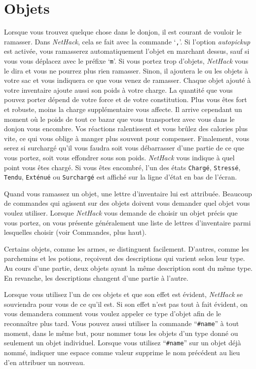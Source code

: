 \documentclass[titlepage]{article}
\begin{document}
\section{Objets}

Lorsque vous trouvez quelque chose dans le donjon, il est courant de vouloir le
ramasser.  Dans \textit{NetHack}, cela se fait avec la commande `\texttt{,}'.
Si l'option \textit{autopickup} est activée, vous ramasserez automatiquement l'objet
en marchant dessus, sauf si vous vous déplacez avec le préfixe `\texttt{m}'.
Si vous portez trop d'objets, \textit{NetHack} vous le dira et vous ne
pourrez plus rien ramasser.  Sinon, il ajoutera le ou les objets
à votre sac et vous indiquera ce que vous venez de ramasser.
Chaque objet ajouté à votre inventaire ajoute aussi son poids
à votre charge.  La quantité que vous pouvez porter dépend de votre force et de
votre constitution.  Plus
vous êtes fort et robuste,
moins la charge supplémentaire vous affecte.  Il arrive cependant
un moment où le poids de tout ce bazar que vous transportez
avec vous dans le donjon vous encombre.  Vos réactions
ralentissent et vous brûlez des calories plus vite, ce qui vous oblige à manger
plus souvent pour compenser.  Finalement, vous serez si surchargé qu'il vous faudra
soit vous débarrasser d'une partie de ce que vous portez, soit vous effondrer sous son poids.
\textit{NetHack} vous indique à quel point vous êtes chargé.
Si vous êtes encombré, l'un des états
\texttt{Chargé}, \texttt{Stressé}, \texttt{Tendu},
\texttt{Exténué} ou \texttt{Surchargé} est
affiché sur la ligne d'état en bas de l'écran.

Quand vous ramassez un objet, une lettre d'inventaire lui est attribuée.  Beaucoup
de commandes qui agissent sur des objets doivent vous demander quel objet
vous voulez utiliser.  Lorsque \textit{NetHack} vous demande de choisir un objet précis
que vous portez, on vous présente généralement une liste de lettres
d'inventaire parmi lesquelles choisir (voir Commandes, plus haut).

Certains objets, comme les armes, se distinguent facilement.  D'autres, comme
les parchemins et les potions, reçoivent des descriptions qui varient selon leur
type.  Au cours d'une partie, deux objets ayant la même description sont
du même type.  En revanche, les descriptions changent d'une partie à l'autre.

Lorsque vous utilisez l'un de ces objets et que son effet est évident, \textit{NetHack}
se souviendra pour vous de ce qu'il est.  Si son effet n'est pas tout à fait
évident, on vous demandera comment vous voulez appeler ce type d'objet
afin de le reconnaître plus tard.  Vous pouvez aussi utiliser la commande ``\texttt{\#name}''
à tout moment, dans le même but, pour nommer
tous les objets d'un type donné ou seulement un objet individuel.
Lorsque vous utilisez ``\texttt{\#name}'' sur un objet déjà nommé,
indiquer une espace comme valeur supprime le nom précédent au lieu
d'en attribuer un nouveau.
\end{document}
